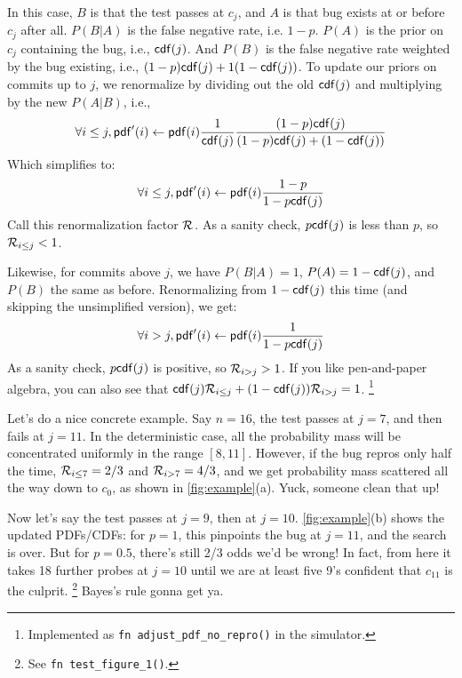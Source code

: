 \documentclass[11pt]{sigplanconf}
\begin{document}
In this case, $B$ is that the test passes at $c_j$, and $A$ is that bug exists at or before $c_j$ after all.
$P(B|A)$ is the false negative rate, i.e. $1-p$.
$P(A)$ is the prior on $c_j$ containing the bug, i.e., $\mathsf{cdf}(j)$.
And $P(B)$ is the false negative rate weighted by the bug existing, i.e., $(1-p)\mathsf{cdf}(j) + 1(1-\mathsf{cdf}(j))$.
To update our priors on commits up to $j$, we renormalize by dividing out the old $\mathsf{cdf}(j)$
and multiplying by the new $P(A|B)$, i.e.,
\[
	\forall i \le j, \mathsf{pdf}'(i)
	\leftarrow
	\mathsf{pdf}(i)
	\frac{1}{\mathsf{cdf}(j)}
	\frac{(1-p)\mathsf{cdf}(j)}{(1-p)\mathsf{cdf}(j) + (1-\mathsf{cdf}(j))}
\]
Which simplifies to:
\[
	\forall i \le j, \mathsf{pdf}'(i)
	\leftarrow
	\mathsf{pdf}(i)
	\frac{1-p}{1 - p\mathsf{cdf}(j)}
\]
Call this renormalization factor $\mathcal{R}_{}$.
As a sanity check, $p\mathsf{cdf}(j)$ is less than $p$, so $\mathcal{R}_{i\le j} < 1$.

Likewise, for commits above $j$, we have $P(B|A) = 1$, $P(A) = 1-\mathsf{cdf}(j)$, and $P(B)$ the same as before.
Renormalizing from $1-\mathsf{cdf}(j)$ this time (and skipping the unsimplified version), we get:
\[
	\forall i > j, \mathsf{pdf}'(i)
	\leftarrow
	\mathsf{pdf}(i)
	\frac{1}{1 - p\mathsf{cdf}(j)}
\]
As a sanity check, $p\mathsf{cdf}(j)$ is positive, so $\mathcal{R}_{i > j} > 1$.
If you like pen-and-paper algebra, you can also see that
$
\mathsf{cdf}(j)
\mathcal{R}_{i \le j}
+
(1-\mathsf{cdf}(j))
\mathcal{R}_{i>j}
= 1$.%
\footnote{Implemented as {\tt fn adjust\_pdf\_no\_repro()} in the simulator.}


Let's do a nice concrete example.
Say $n=16$, the test passes at $j=7$, and then fails at $j=11$.
In the deterministic case, all the probability mass will be concentrated uniformly in the range $[8,11]$.
However, if the bug repros only half the time,
$\mathcal{R}_{i \le 7} = 2/3$
and
$\mathcal{R}_{i > 7} = 4/3$,
and we get probability mass scattered all the way down to $c_0$,
as shown in \cref{fig:example}(a).
Yuck, someone clean that up!

Now let's say the test passes at $j=9$, then at $j=10$.
\cref{fig:example}(b) shows the updated PDFs/CDFs:
for $p=1$, this pinpoints the bug at $j=11$, and the search is over.
But for $p=0.5$, there's still 2/3 odds we'd be wrong!
In fact, from here it takes 18 further probes at $j=10$ until we are at least five 9's confident that $c_{11}$ is the culprit.%
\footnote{See {\tt fn test\_figure\_1()}.}
Bayes's rule gonna get ya.
\end{document}
